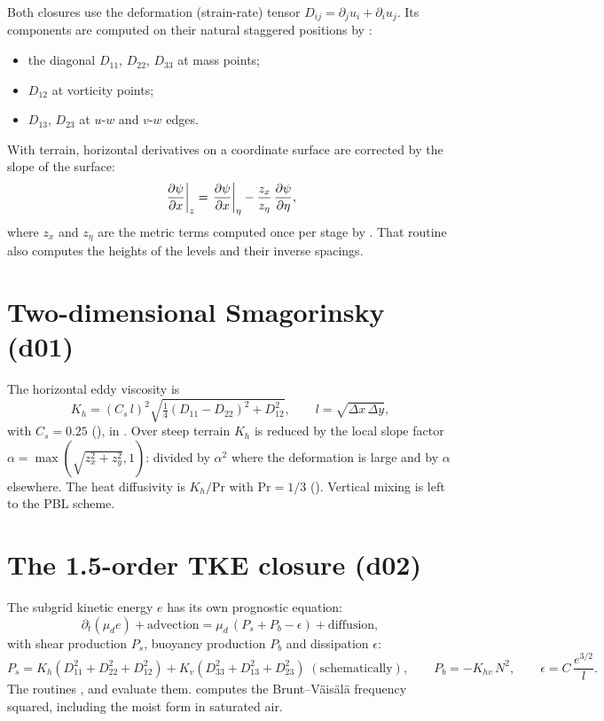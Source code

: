Both closures use the deformation (strain-rate) tensor $D_{ij} = \partial_j u_i + \partial_i u_j$. Its components are
computed on their natural staggered positions by :
\begin{itemize}
  \item the diagonal $D_{11}$, $D_{22}$, $D_{33}$ at mass points;
  \item $D_{12}$ at vorticity points;
  \item $D_{13}$, $D_{23}$ at $u$-$w$ and $v$-$w$ edges.
\end{itemize}
With terrain, horizontal derivatives on a coordinate surface are corrected by the slope of the surface:
\begin{equation}
  \left.\frac{\partial \psi}{\partial x}\right|_z = \left.\frac{\partial \psi}{\partial x}\right|_\eta - \frac{z_x}{z_\eta}\,\frac{\partial \psi}{\partial \eta},
\end{equation}
where $z_x$ and $z_\eta$ are the metric terms computed once per stage by
. That routine also computes the heights of the levels and
their inverse spacings.

\section{Two-dimensional Smagorinsky (d01)}

The horizontal eddy viscosity is
\begin{equation}
  K_h = (C_s\,l)^2\sqrt{\tfrac14(D_{11} - D_{22})^2 + D_{12}^2}, \qquad l = \sqrt{\Delta x\,\Delta y},
\end{equation}
with $C_s = 0.25$ (), in . Over steep terrain $K_h$ is reduced
by the local slope factor $\alpha = \max(\sqrt{z_x^2 + z_y^2}, 1)$: divided by $\alpha^2$ where the deformation is
large and by $\alpha$ elsewhere. The heat diffusivity is $K_h/\mathrm{Pr}$ with $\mathrm{Pr} = 1/3$
(). Vertical mixing is left to the PBL scheme.

\section{The 1.5-order TKE closure (d02)}

The subgrid kinetic energy $e$ has its own prognostic equation:
\begin{equation}
  \partial_t(\mu_d e) + \text{advection} = \mu_d\,(P_s + P_b - \epsilon) + \text{diffusion},
\end{equation}
with shear production $P_s$, buoyancy production $P_b$ and dissipation $\epsilon$:
\begin{equation}
  P_s = K_h(D_{11}^2 + D_{22}^2 + D_{12}^2) + K_v(D_{33}^2 + D_{13}^2 + D_{23}^2) \;(\text{schematically}),\qquad
  P_b = -K_{hv}\,N^2, \qquad
  \epsilon = C\,\frac{e^{3/2}}{l}.
\end{equation}
The routines ,  and  evaluate them.
 computes the Brunt--V\"ais\"al\"a frequency squared, including the moist form in saturated
air.

